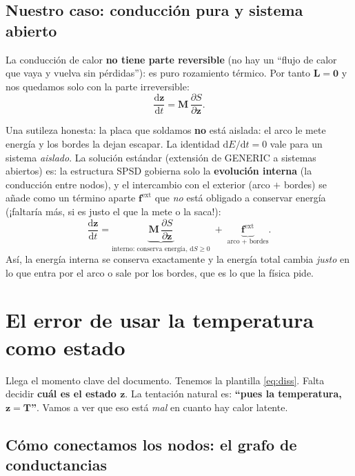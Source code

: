 \documentclass[11pt]{article}
\newcommand{\dd}{\mathrm{d}}
\theoremstyle{definition}
\theoremstyle{plain}
\begin{document}
\subsection{Nuestro caso: conducción pura y sistema abierto}

La conducción de calor \textbf{no tiene parte reversible} (no hay un ``flujo de
calor que vaya y vuelva sin pérdidas''): es puro rozamiento térmico. Por tanto
$\bm L=\bm 0$ y nos quedamos solo con la parte irreversible:
\begin{equation}
  \frac{\dd\bm z}{\dd t} = \bm M\,\frac{\partial S}{\partial\bm z}.
  \label{eq:diss}
\end{equation}

Una sutileza honesta: la placa que soldamos \textbf{no} está aislada: el arco le
mete energía y los bordes la dejan escapar. La identidad $\dd E/\dd t=0$ vale para
un sistema \emph{aislado}. La solución estándar (extensión de GENERIC a sistemas
abiertos) es: la estructura SPSD gobierna solo la \textbf{evolución interna} (la
conducción entre nodos), y el intercambio con el exterior (arco $+$ bordes) se añade
como un término aparte $\bm f^{\mathrm{ext}}$ que \emph{no} está obligado a
conservar energía (¡faltaría más, si es justo el que la mete o la saca!):
\begin{equation}
  \frac{\dd\bm z}{\dd t}
  = \underbrace{\bm M\,\frac{\partial S}{\partial\bm z}}_{\text{interno: conserva energía, } \dd S\ge0}
  \;+\; \underbrace{\bm f^{\mathrm{ext}}}_{\text{arco + bordes}}.
  \label{eq:open}
\end{equation}
Así, la energía interna se conserva exactamente y la energía total cambia
\emph{justo} en lo que entra por el arco o sale por los bordes, que es lo que la
física pide.

\section{El error de usar la temperatura como estado}
\label{sec:error}

Llega el momento clave del documento. Tenemos la plantilla \eqref{eq:diss}. Falta
decidir \textbf{cuál es el estado $\bm z$}. La tentación natural es:
\textbf{``pues la temperatura, $\bm z=\bm T$''}. Vamos a ver que eso está
\emph{mal} en cuanto hay calor latente.

\subsection{Cómo conectamos los nodos: el grafo de conductancias}
\end{document}
